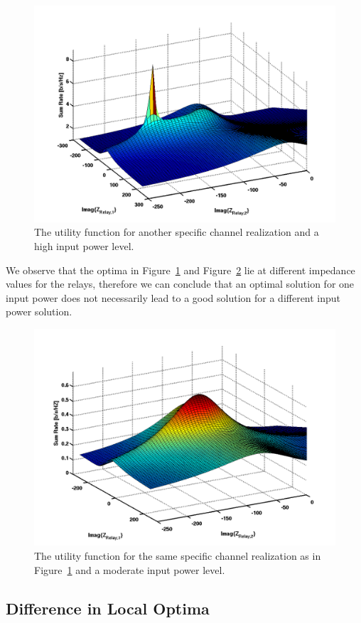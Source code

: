 \begin{figure}[h]
\centering
  \includegraphics[width=0.8\linewidth]{images/full_mesh_highsnr_99.png}
\caption{The utility function for another specific channel realization and a high input power level.}
\label{fig:utility_power2}
\end{figure}

We observe that the optima in Figure~\ref{fig:utility_power2} and Figure~\ref{fig:utility_power3} lie at different impedance values for the relays, therefore we can conclude that an optimal solution for one input power does not necessarily lead to a good solution for a different input power solution.

\begin{figure}[h]
\centering
  \includegraphics[width=0.8\linewidth]{images/full_mesh_modsnr_99.png}
\caption{The utility function for the same specific channel realization as in Figure~\ref{fig:utility_power2} and a moderate input power level.}
\label{fig:utility_power3}
\end{figure}

\subsection{Difference in Local Optima}
\label{sec:diflocop}

